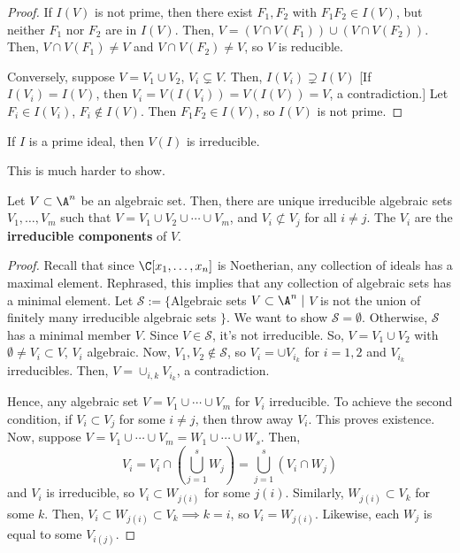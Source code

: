 \begin{proof}
    If $I(V)$ is not prime, then there exist $F_1,F_2$ with $F_1F_2 \in I(V)$, but neither $F_1$ nor $F_2$ are in $I(V)$. Then, $V=(V \cap V(F_1)) \cup (V \cap V(F_2))$. Then, $V \cap V(F_1) \neq V$ and $V \cap V(F_2) \neq V$, so $V$ is reducible.

    Conversely, suppose $V= V_1 \cup V_2$, $V_i \subsetneq V$. Then, $I(V_i) \supsetneq I(V)$ [If $I(V_i)=I(V)$, then $V_i=V(I(V_i))=V(I(V))=V$, a contradiction.] Let $F_i \in I(V_i)$, $F_i \not \in I(V)$. Then $F_1F_2 \in I(V)$, so $I(V)$ is not prime.
\end{proof}

\begin{thm}
    If $I$ is a prime ideal, then $V(I)$ is irreducible.
\end{thm}
This is much harder to show.

\begin{thm}
    Let $V \subset \A^n$ be an algebraic set. Then, there are unique irreducible algebraic sets $V_1,\dots,V_m$ such that $V=V_1 \cup V_2 \cup \cdots \cup V_m$, and $V_i \not \subset V_j$ for all $i \neq j$. The $V_i$ are the \textbf{irreducible components} of $V$.
\end{thm}

\begin{proof}
    Recall that since $\C[x_1,\dots,x_n]$ is Noetherian, any collection of ideals has a maximal element. Rephrased, this implies that any collection of algebraic sets has a minimal element. Let $\mathcal S := \{$Algebraic sets $V \subset \A^n \mid$ $V$ is not the union of finitely many irreducible algebraic sets $\}$. We want to show $\mathcal S = \emptyset$. Otherwise, $\mathcal S$ has a minimal member $V$. Since $V \in \mathcal S$, it's not irreducible. So, $V = V_1\cup V_2$ with $\emptyset \neq V_i \subset V$, $V_i$ algebraic. Now, $V_1, V_2 \not \in \mathcal S$, so $V_i = \cup V_{i_k}$ for $i=1,2$ and $V_{i_k}$ irreducibles. Then, $V= \cup_{i,k}V_{i_k}$, a contradiction.

    Hence, any algebraic set $V= V_1 \cup \cdots \cup V_m$ for $V_i$ irreducible. To achieve the second condition, if $V_i \subset V_j$ for some $i \neq j$, then throw away $V_i$. This proves existence. Now, suppose $V=V_1\cup \cdots \cup V_m=W_1\cup \cdots \cup W_s$. Then,
    $$V_i = V_i \cap (\bigcup_{j=1}^s W_j)=\bigcup _{j=1}^s(V_i \cap W_j)$$
    and $V_i$ is irreducible, so $V_i \subset W_{j(i)}$ for some $j(i)$. Similarly, $W_{j(i)}\subset V_k$ for some $k$. Then, $V_i \subset W_{j(i)}\subset V_k \implies k=i$, so $V_i = W_{j(i)}$. Likewise, each $W_j$ is equal to some $V_{i(j)}$.
\end{proof}

